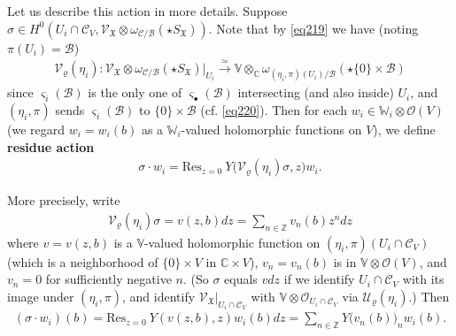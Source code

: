 \documentclass[12pt,a4paper,notitlepage]{article}
\theoremstyle{definition}
\theoremstyle{plain}
\newcommand{\fk}{\mathfrak}
\newcommand{\mc}{\mathcal}
\newcommand{\Res}{\mathrm{Res}}
\newcommand{\scr}{\mathscr}
\newcommand{\sgm}{\varsigma}
\newcommand{\SX}{{S_{\fk X}}}
\newcommand{\blt}{\bullet}
\newcommand{\Vbb}{\mathbb V}
\newcommand{\Wbb}{\mathbb W}
\newcommand{\Cbb}{\mathbb C}
\newcommand{\Zbb}{\mathbb Z}
\numberwithin{equation}{section}
\begin{document}
Let us describe this action in more details. Suppose $\sigma\in H^0(U_i\cap\mc C_V,\scr V_{\fk X}\otimes\omega_{\mc C/\mc B}(\star\SX))$. Note that by \eqref{eq219} we have (noting $\pi(U_i)=\mc B$)
\begin{align}
\mc V_\varrho(\eta_i):\scr V_{\fk X}\otimes\omega_{\mc C/\mc B}(\star\SX)\big|_{U_i}\xrightarrow{\simeq} \Vbb\otimes_\Cbb\omega_{(\eta_i,\pi)(U_i)/\mc B}(\star \{0\}\times\mc B)
\end{align}
since $\sgm_i(\mc B)$ is the only one of $\sgm_\blt(\mc B)$ intersecting (and also inside) $U_i$, and $(\eta_i,\pi)$ sends $\sgm_i(\mc B)$ to $\{0\}\times\mc B$ (cf. \eqref{eq220}). Then for each $w_i\in\Wbb_i\otimes\scr O(V)$ (we regard $w_i=w_i(b)$ as a $\Wbb_i$-valued holomorphic functions on $V$), we define \textbf{residue action}
\begin{align}
\sigma\cdot w_i=\Res_{z=0}~Y\big(\mc V_\varrho(\eta_i)\sigma,z \big)w_i.\label{eq226}
\end{align}

More precisely, write
\begin{align}
\mc V_\varrho(\eta_i)\sigma=v(z,b)dz=\sum_{n\in\Zbb}v_n(b)z^ndz
\end{align}
where $v=v(z,b)$ is a $\Vbb$-valued holomorphic function on $(\eta_i,\pi)(U_i\cap \mc C_V)$ (which is a neighborhood of $\{0\}\times V$ in $\Cbb\times V$), $v_n=v_n(b)$ is in $\Vbb\otimes\scr O(V)$, and $v_n=0$ for sufficiently negative $n$. (So $\sigma$ equals $vdz$ if we identify $U_i\cap\mc C_V$ with its image under $(\eta_i,\pi)$, and identify $\scr V_{\fk X}|_{U_i\cap\mc C_V}$ with $\Vbb\otimes\scr O_{U_i\cap\mc C_V}$ via $\mc U_\varrho(\eta_i)$.) Then
\begin{align}
(\sigma\cdot w_i)(b)=\Res_{z=0}~Y(v(z,b),z)w_i(b)dz=\sum_{n\in\Zbb} Y\big(v_n(b)\big)_nw_i(b).
\end{align}
\end{document}
